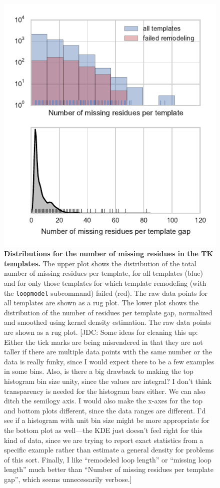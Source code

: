 \documentclass[aps,pre,twocolumn,nofootinbib,superscriptaddress,linenumbers]{revtex4-1}
\begin{document}
\begin{figure}[tbp]
    \includegraphics[width=\textwidth]{loopmodel_analysis/nmissing_resis_distributions.pdf}
    \caption{{\bf Distributions for the number of missing residues in the TK templates.}
    The upper plot shows the distribution of the total number of missing residues per template, for all templates (blue) and for only those templates for which template remodeling (with the {\tt loopmodel} subcommand) failed (red). The raw data points for all templates are shown as a rug plot.
    The lower plot shows the distribution of the number of residues per template gap, normalized and smoothed using kernel density estimation. The raw data points are shown as a rug plot.
    {\color{red}[JDC: Some ideas for cleaning this up: Either the tick marks are being misrendered in that they are not taller if there are multiple data points with the same number or the data is really funky, since I would expect there to be a few examples in some bins.  Also, is there a big drawback to making the top histogram bin size unity, since the values are integral?  I don't think transparency is needed for the histogram bars either.  We can also ditch the semilogy axis.  I would also make the x-axes for the top and bottom plots different, since the data ranges are different.  I'd see if a histogram with unit bin size might be more appropriate for the bottom plot as well---the KDE just doesn't feel right for this kind of data, since we are trying to report exact statistics from a specific example rather than estimate a general density for problems of this sort.  Finally, I like ``remodeled loop length'' or ``missing loop length'' much better than ``Number of missing residues per template gap'', which seems unnecessarily verbose.]}
}
    \label{figure:loopmodel-nmissing-residues}
\end{figure}
\end{document}
